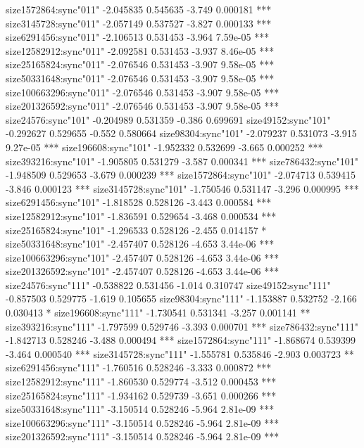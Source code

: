 \documentclass[11pt]{article}
\begin{document}
\begin{Schunk}
\begin{Soutput}
size1572864:sync"011"          -2.045835   0.545635  -3.749 0.000181 ***
size3145728:sync"011"          -2.057149   0.537527  -3.827 0.000133 ***
size6291456:sync"011"          -2.106513   0.531453  -3.964 7.59e-05 ***
size12582912:sync"011"         -2.092581   0.531453  -3.937 8.46e-05 ***
size25165824:sync"011"         -2.076546   0.531453  -3.907 9.58e-05 ***
size50331648:sync"011"         -2.076546   0.531453  -3.907 9.58e-05 ***
size100663296:sync"011"        -2.076546   0.531453  -3.907 9.58e-05 ***
size201326592:sync"011"        -2.076546   0.531453  -3.907 9.58e-05 ***
size24576:sync"101"            -0.204989   0.531359  -0.386 0.699691    
size49152:sync"101"            -0.292627   0.529655  -0.552 0.580664    
size98304:sync"101"            -2.079237   0.531073  -3.915 9.27e-05 ***
size196608:sync"101"           -1.952332   0.532699  -3.665 0.000252 ***
size393216:sync"101"           -1.905805   0.531279  -3.587 0.000341 ***
size786432:sync"101"           -1.948509   0.529653  -3.679 0.000239 ***
size1572864:sync"101"          -2.074713   0.539415  -3.846 0.000123 ***
size3145728:sync"101"          -1.750546   0.531147  -3.296 0.000995 ***
size6291456:sync"101"          -1.818528   0.528126  -3.443 0.000584 ***
size12582912:sync"101"         -1.836591   0.529654  -3.468 0.000534 ***
size25165824:sync"101"         -1.296533   0.528126  -2.455 0.014157 *  
size50331648:sync"101"         -2.457407   0.528126  -4.653 3.44e-06 ***
size100663296:sync"101"        -2.457407   0.528126  -4.653 3.44e-06 ***
size201326592:sync"101"        -2.457407   0.528126  -4.653 3.44e-06 ***
size24576:sync"111"            -0.538822   0.531456  -1.014 0.310747    
size49152:sync"111"            -0.857503   0.529775  -1.619 0.105655    
size98304:sync"111"            -1.153887   0.532752  -2.166 0.030413 *  
size196608:sync"111"           -1.730541   0.531341  -3.257 0.001141 ** 
size393216:sync"111"           -1.797599   0.529746  -3.393 0.000701 ***
size786432:sync"111"           -1.842713   0.528246  -3.488 0.000494 ***
size1572864:sync"111"          -1.868674   0.539399  -3.464 0.000540 ***
size3145728:sync"111"          -1.555781   0.535846  -2.903 0.003723 ** 
size6291456:sync"111"          -1.760516   0.528246  -3.333 0.000872 ***
size12582912:sync"111"         -1.860530   0.529774  -3.512 0.000453 ***
size25165824:sync"111"         -1.934162   0.529739  -3.651 0.000266 ***
size50331648:sync"111"         -3.150514   0.528246  -5.964 2.81e-09 ***
size100663296:sync"111"        -3.150514   0.528246  -5.964 2.81e-09 ***
size201326592:sync"111"        -3.150514   0.528246  -5.964 2.81e-09 ***

\end{Soutput}
\end{Schunk}
\end{document}
